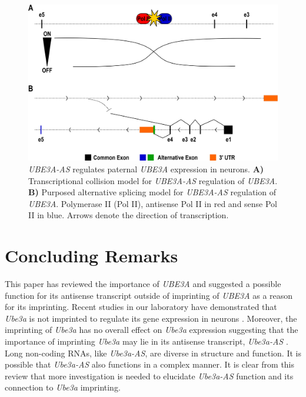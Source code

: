 {%
\begin{figure}[!ht]
\centering
\includegraphics[scale=0.45]{figures/Ube3a-AS_mechanism.pdf}
\caption{\emph{UBE3A-AS} regulates paternal \emph{UBE3A} expression in neurons. \textbf{A)} Transcriptional collision model for \emph{UBE3A-AS} regulation of \emph{UBE3A}. \textbf{B)} Purposed alternative splicing model for \emph{UBE3A-AS} regulation of \emph{UBE3A}. Polymerase II (Pol II), antisense Pol II in red and sense Pol II in blue. Arrows denote the direction of transcription.}
\label{Figure 1-12: }
\end{figure}

\section{Concluding Remarks}

This paper has reviewed the importance of \textit{UBE3A} and suggested a possible function for its antisense transcript outside of imprinting of \textit{UBE3A} as a reason for its imprinting. Recent studies in our laboratory have demonstrated that \textit{Ube3a} is not imprinted to regulate its gene expression in neurons \cite{Hillman2017}. Moreover, the imprinting of \textit{Ube3a} has no overall effect on \textit{Ube3a} expression suggesting that the importance of imprinting \textit{Ube3a} may lie in its antisense transcript, \textit{Ube3a-AS} \cite{Hillman2017}. Long non-coding RNAs, like \textit{Ube3a-AS}, are diverse in structure and function. It is possible that \textit{Ube3a-AS} also functions in a complex manner. It is clear from this review that more investigation is needed to elucidate \textit{Ube3a-AS} function and its connection to \textit{Ube3a} imprinting.

}
